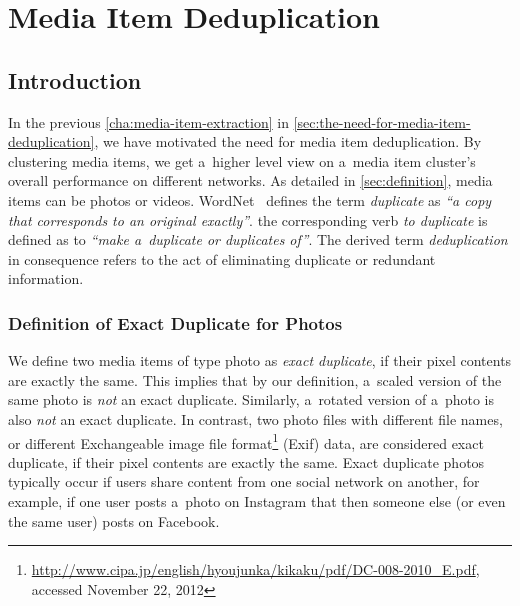 \chapter{Media Item Deduplication}
\label{sec:media-item-deduplication}

\ifpdf
    \graphicspath{{6_media_item_deduplication/figures/PNG/}{6_media_item_deduplication/figures/PDF/}{6_media_item_deduplication/figures/}}
\else
    \graphicspath{{6_media_item_deduplication/figures/EPS/}{6_media_item_deduplication/figures/}}
\fi

\section{Introduction}

In the previous \autoref{cha:media-item-extraction}
in \autoref{sec:the-need-for-media-item-deduplication},
we have motivated the need for media item deduplication.
By clustering media items, we get a~higher level view on
a~media item cluster's overall performance on different networks.
As detailed in \autoref{sec:definition}, media items can be
photos or videos.
WordNet~\cite{fellbaum1998wordnet,miller1995wordnet} defines
the term \emph{duplicate} as
\textit{``a copy that corresponds to an original exactly''}.
the corresponding verb \emph{to duplicate} is defined as to
\textit{``make a~duplicate or duplicates of''}.
The derived term \emph{deduplication} in consequence refers to
the act of eliminating duplicate or redundant information.

\subsection{Definition of Exact Duplicate for Photos}

We define two media items of type photo as \emph{exact duplicate},
if their pixel contents are exactly the same.
This implies that by our definition, a~scaled version
of the same photo is \emph{not} an exact duplicate. 
Similarly, a~rotated version of a~photo is also \emph{not}
an exact duplicate. 
In contrast, two photo files with different file names,
or different Exchangeable image file
format\footnote{\url{http://www.cipa.jp/english/hyoujunka/kikaku/pdf/DC-008-2010_E.pdf},
accessed November 22, 2012}
(Exif) data, are considered exact duplicate,
if their pixel contents are exactly the same.
Exact duplicate photos typically occur if users share content 
from one social network on another, for example,
if one user posts a~photo on Instagram that then someone else
(or even the same user) posts on Facebook.

